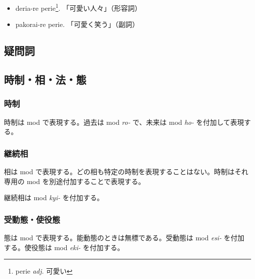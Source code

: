 \begin{itemize}
    \item deria-re perie\footnote{perie \emph{adj.} 可愛い}. 「可愛い人々」（形容詞）
    \item pakorai-re perie. 「可愛く笑う」（副詞）
\end{itemize}

\subsection{疑問詞}

\subsection{時制・相・法・態}

\subsubsection{時制}

時制は mod で表現する。過去は mod \emph{ro-} で、未来は mod \emph{ho-} を付加して表現する。

\subsubsection{継続相}

相は mod で表現する。どの相も特定の時制を表現することはない。時制はそれ専用の mod を別途付加することで表現する。

継続相は mod \emph{kyi-} を付加する。

\subsubsection{受動態・使役態}

態は mod で表現する。能動態のときは無標である。受動態は mod \emph{esi-} を付加する。使役態は mod \emph{eki-} を付加する。
